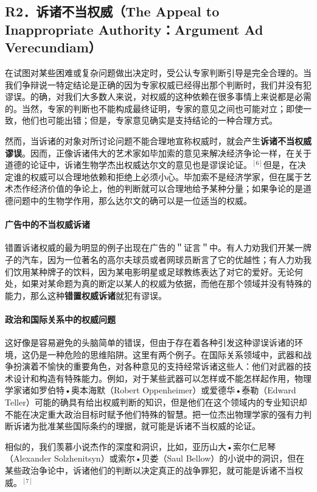 \subsection{R2．诉诸不当权威（The Appeal to Inappropriate Authority：Argument Ad Verecundiam）}

在试图对某些困难或复杂问题做出决定时，受公认专家判断引导是完全合理的。当我们争辩说一特定结论是正确的因为专家权威已经得出那个判断时，我们并没有犯谬误。的确，对我们大多数人来说，对权威的这种依赖在很多事情上来说都是必需的。当然，专家的判断也不能构成最终证明，专家的意见之间也可能对立；即使一致，他们也可能出错；但是，专家意见确实是支持结论的一种合理方式。

然而，当诉诸的对象对所讨论问题不能合理地宣称权威时，就会产生\textbf{诉诸不当权威谬误}。因而，正像诉诸伟大的艺术家如毕加索的意见来解决经济争论一样，在关于道德的论证中，诉诸生物学杰出权威达尔文的意见也是谬误论证。${ }^{[6]}$但是，在决定谁的权威可以合理地依赖和拒绝上必须小心。毕加索不是经济学家，但在属于艺术杰作经济价值的争论上，他的判断就可以合理地给予某种分量；如果争论的是道德问题中的生物学作用，那么达尔文的确可以是一位适当的权威。

\paragraph{广告中的不当权威诉诸}
错置诉诸权威的最为明显的例子出现在广告的＂证言＂中。有人力劝我们开某一牌子的汽车，因为一位著名的高尔夫球员或者网球员断言了它的优越性；有人力劝我们饮用某种牌子的饮料，因为某电影明星或足球教练表达了对它的爱好。无论何处，如果对某命题为真的断定以某人的权威为依据，而他在那个领域并没有特殊的能力，那么这种\textbf{错置权威诉诸}就犯有谬误。

\paragraph{政治和国际关系中的权威问题}
这好像是容易避免的头脑简单的错误，但由于存在着各种引发这种谬误诉诸的环境，这仍是一种危险的思维陷阱。这里有两个例子。在国际关系领域中，武器和战争扮演着不愉快的重要角色，对各种意见的支持经常诉诸这些人：他们对武器的技术设计和构造有特殊能力。例如，对于某些武器可以怎样或不能怎样起作用，物理学家诸如罗伯特•奥本海默（Robert Oppenheimer）或爱德华•泰勒（Edward Teller）可能的确具有给出权威判断的知识，但是他们在这个领域内的专业知识却不能在决定重大政治目标时赋予他们特殊的智慧。把一位杰出物理学家的强有力判断诉诸为批准某些国际条约的理据，就可能是诉诸不当权威的论证。

相似的，我们羡慕小说杰作的深度和洞识，比如，亚历山大•索尔仁尼琴（Alexander Solzhenitsyn）或索尔•贝娄（Saul Bellow）的小说中的洞识，但在某些政治争论中，诉诸他们的判断以决定真正的战争罪犯，就可能是诉诸不当权威。${ }^{[7]}$

